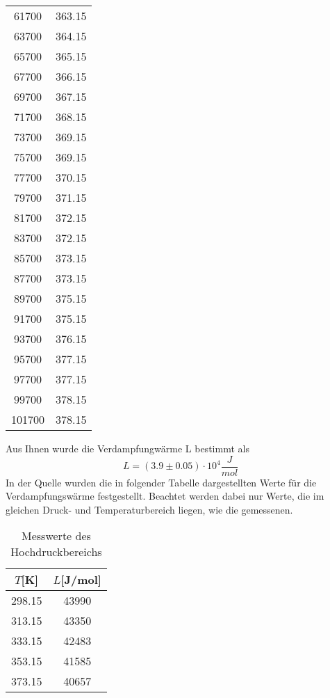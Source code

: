 \begin{table}[H]
\begin{tabular}{c c}
      61700 &   363.15 \\ 
      63700 &   364.15 \\ 
      65700 &   365.15 \\ 
      67700 &   366.15 \\ 
      69700 &   367.15 \\ 
      71700 &   368.15 \\ 
      73700 &   369.15 \\ 
      75700 &   369.15 \\ 
      77700 &   370.15 \\ 
      79700 &   371.15 \\ 
      81700 &   372.15 \\ 
      83700 &   372.15 \\ 
      85700 &   373.15 \\ 
      87700 &   373.15 \\
      89700 &   375.15 \\ 
      91700 &   375.15 \\ 
      93700 &   376.15 \\ 
      95700 &   377.15 \\ 
      97700 &   377.15 \\ 
      99700 &   378.15 \\ 
      101700 &   378.15 \\ 
    \bottomrule
    \end{tabular}
\end{table}
Aus Ihnen wurde die Verdampfungwärme L bestimmt als 
\begin{equation*}
    L= (3.9 \pm 0.05) \cdot 10^4 \dfrac{J}{mol}
\end{equation*}
In der Quelle \cite{Verdampfungwärme} wurden die in folgender Tabelle dargestellten Werte
für die Verdampfungswärme festgestellt. Beachtet werden dabei nur Werte, die im gleichen 
Druck- und Temperaturbereich liegen, wie die gemessenen.
\begin{table}[H]
\centering
   \caption{Messwerte des Hochdruckbereichs}
   \label{tab:ndrtheo}
   \begin{tabular}{c c}
   \toprule
    $T$[K] & $L$[J/mol] \\
    \midrule
    298.15 &    43990 \\ 
    313.15 &    43350 \\   
    333.15 &    42483 \\   
    353.15 &    41585 \\   
    373.15 &    40657 \\   
    \bottomrule
    \end{tabular}
\end{table}
